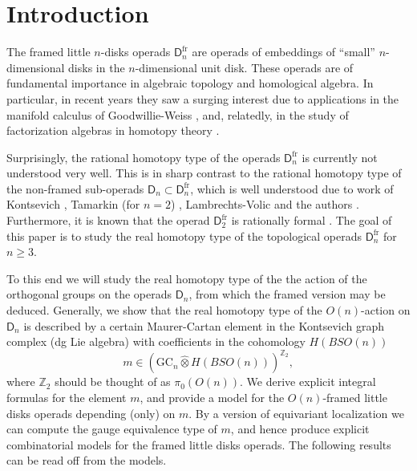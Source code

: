 \documentclass[a4paper]{amsart}
\theoremstyle{plain}
\theoremstyle{definition}
\newcommand{\Z}{{\mathbb{Z}}}
\newcommand{\GC}{\mathrm{GC}}
\newcommand{\SO}{\mathit{SO}}
\newcommand{\lD}{\mathsf{D}}
\newcommand{\flD}{\lD^{\mathrm{fr}}}
\begin{document}
\maketitle

\tableofcontents

\section{Introduction}

The framed little $n$-disks operads $\flD_n$ are operads of embeddings of ``small'' $n$-dimensional disks in the $n$-dimensional unit disk. 
These operads are of fundamental importance in algebraic topology and homological algebra. In particular, in recent years they saw a surging interest due to applications in the manifold calculus of Goodwillie-Weiss \cite{G,GW}, and, relatedly, in the study of factorization algebras in homotopy theory \cite{AF}.

Surprisingly, the rational homotopy type of the operads $\flD_n$ is currently not understood very well.
This is in sharp contrast to the rational homotopy type of the non-framed sub-operads $\lD_n\subset \flD_n$, which is well understood due to work of Kontsevich \cite{K2}, Tamarkin (for $n=2$) \cite{Tam}, Lambrechts-Volic \cite{LV} and the authors \cite{FTW}.
Furthermore, it is known that the operad $\flD_2$ is rationally formal \cite{pavolfr, GS}.
The goal of this paper is to study the real homotopy type of the topological operads $\flD_n$ for $n\geq 3$.

To this end we will study the real homotopy type of the the action of the orthogonal groups on the operads $\lD_n$, from which the framed version may be deduced.
Generally, we show that the real homotopy type of the $O(n)$-action on $\lD_n$ is described by a certain Maurer-Cartan element in the Kontsevich graph complex (dg Lie algebra) with coefficients in the cohomology $H(B\SO(n))$
\[
 m\in \left( \GC_n\hat \otimes H(B\SO(n)) \right)^{\Z_2},
\]
where $\Z_2$ should be thought of as $\pi_0(O(n))$.
We derive explicit integral formulas for the element $m$, and provide a model for the $O(n)$-framed little disks operads depending (only) on $m$. 
By a version of equivariant localization we can compute the gauge equivalence type of $m$, and hence produce explicit combinatorial models for the framed little disks operads.
The following results can be read off from the models.

\end{document}
